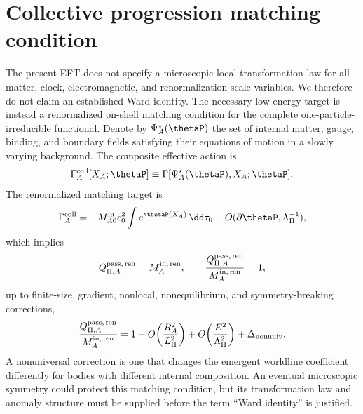 \documentclass[12pt]{article}
\begin{document}
\section{Collective progression matching condition}
\label{sec:matching-condition}

The present EFT does not specify a microscopic local transformation law for all matter, clock, electromagnetic, and renormalization-scale variables.  We therefore do not claim an established Ward identity.  The necessary low-energy target is instead a renormalized on-shell matching condition for the complete one-particle-irreducible functional.  Denote by \(\Psi_A^\star(\thetaP)\) the set of internal matter, gauge, binding, and boundary fields satisfying their equations of motion in a slowly varying background.  The composite effective action is
\begin{equation}
    \Gamma_A^{\rm coll}[X_A;\thetaP]
    \equiv
    \Gamma[\Psi_A^\star(\thetaP),X_A;\thetaP].
    \label{eq:collective-effective-action}
\end{equation}
The renormalized matching target is
\begin{equation}
    \Gamma_A^{\rm coll}
    =-M_{A0}^{\rm in}c_0^2\int e^{\thetaP(X_A)}\,\dd\tau_0
    +O(\partial\thetaP,\Lambda_\Pi^{-1}),
    \label{eq:normalized-master-matching}
\end{equation}
which implies
\begin{equation}
    Q_{\Pi,A}^{{\rm pass},\,\rm ren}
    =M_A^{{\rm in},\,\rm ren},
    \qquad
    \frac{Q_{\Pi,A}^{{\rm pass},\,\rm ren}}
    {M_A^{{\rm in},\,\rm ren}}=1,
    \label{eq:normalized-matching-EP-protected}
\end{equation}
up to finite-size, gradient, nonlocal, nonequilibrium, and symmetry-breaking corrections,
\begin{equation}
    \frac{Q_{\Pi,A}^{{\rm pass},\,\rm ren}}
    {M_A^{{\rm in},\,\rm ren}}
    =1
    +O\!\left(\frac{R_A^2}{L_\Pi^2}\right)
    +O\!\left(\frac{E^2}{\Lambda_\Pi^2}\right)
    +\Delta_{\rm nonuniv}.
    \label{eq:normalized-renormalized-ratio-condition}
\end{equation}
A nonuniversal correction is one that changes the emergent worldline coefficient differently for bodies with different internal composition.  An eventual microscopic symmetry could protect this matching condition, but its transformation law and anomaly structure must be supplied before the term ``Ward identity'' is justified.
\end{document}
